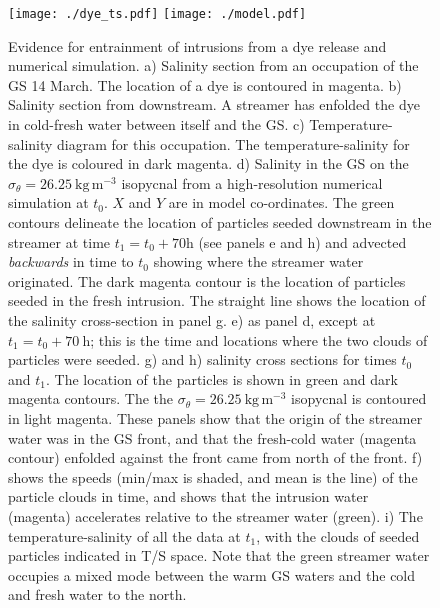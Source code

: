 \documentclass[draft,grl]{agutex2015}
\begin{document}
\begin{article}
\begin{figure}[htbp]
  \centering
    \texttt{[image: ./dye\_ts.pdf]}
    \texttt{[image: ./model.pdf]}
  \caption{Evidence for entrainment of intrusions from a dye release and numerical simulation.
a) Salinity section from an occupation of the GS 14 March. The location of a dye is contoured in magenta.  b) Salinity section from downstream.  A streamer has enfolded the dye in cold-fresh water between itself and the GS.  c) Temperature-salinity diagram for this occupation.  The temperature-salinity for the dye is coloured in dark magenta.  
d) Salinity in the GS on the $\sigma_{\theta}=26.25\  \mathrm{kg\,m^{-3}}$ isopycnal from a high-resolution numerical simulation at $t_0$. $X$ and $Y$ are in model co-ordinates. The green contours delineate the location of particles seeded downstream in the streamer at time $t_1=t_0+70 \mathrm{h}$ (see panels e and h) and advected \emph{backwards} in time to $t_0$ showing where the streamer water originated. The dark magenta contour is the location of particles seeded in the fresh intrusion.  The straight line shows the location of the salinity cross-section in panel g.  e) as panel d, except at $t_1=t_0+70\ \mathrm{h}$; this is the time and locations where the two clouds of particles were seeded.  g) and h) salinity cross sections for times $t_0$ and $t_1$.  The location of the particles is shown in green and dark magenta contours.  The the $\sigma_{\theta}=26.25\  \mathrm{kg\,m^{-3}}$ isopycnal is contoured in light magenta.  These panels show that the origin of the streamer water was in the GS front, and that the fresh-cold water (magenta contour) enfolded against the front came from north of the front.  f) shows the speeds (min/max is shaded, and mean is the line) of the particle clouds in time, and shows that the intrusion water (magenta) accelerates relative to the streamer water (green).  i) The temperature-salinity of all the data at $t_1$, with the clouds of seeded particles indicated in T/S space.  Note that the green streamer water occupies a  mixed mode between the warm GS waters and the cold and fresh water to the north.  
  } \label{fig:StreamersModel}
\end{figure}





\end{article}
\end{document}
